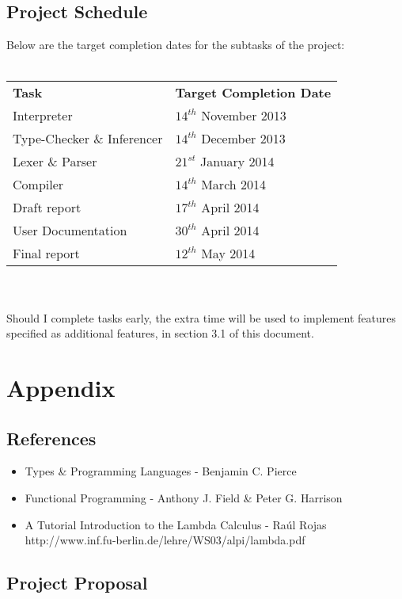 \documentclass{article}
\begin{document}
\subsection{Project Schedule}
Below are the target completion dates for the subtasks of the project:
\\\\
\begin{tabular}{l l}
    \indent \textbf{Task}              & \textbf{Target Completion Date} \\
    \indent Interpreter                & $14^{th}$ November 2013         \\
    \indent Type-Checker \& Inferencer & $14^{th}$ December 2013         \\
    \indent Lexer \& Parser            & $21^{st}$ January  2014         \\
    \indent Compiler                   & $14^{th}$ March    2014         \\
    \indent Draft report               & $17^{th}$ April    2014         \\
    \indent User Documentation         & $30^{th}$ April    2014         \\
    \indent Final report               & $12^{th}$ May      2014         \\
\end{tabular}
\\\\
Should I complete tasks early, the extra time will be used to implement features specified as additional features, in section 3.1 of this document.
\pagebreak
\section{Appendix}
\subsection{References}
\begin{itemize}
    \item Types \& Programming Languages - Benjamin C. Pierce
    \item Functional Programming - Anthony J. Field \& Peter G. Harrison
    \item A Tutorial Introduction to the Lambda Calculus - Ra\'{u}l Rojas \\
        http://www.inf.fu-berlin.de/lehre/WS03/alpi/lambda.pdf
\end{itemize}

\subsection{Project Proposal}
\end{document}
